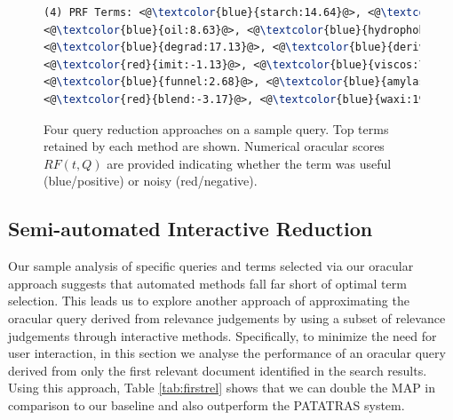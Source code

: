 \begin{figure}[htpb]
\begin{framed}
\begin{lstlisting}[basicstyle=\small\ttfamily , linewidth=\columnwidth,breaklines=true, language=TeX]
(4) PRF Terms: <@\textcolor{blue}{starch:14.64}@>, <@\textcolor{blue}{encapsul:17.50}@>, <@\textcolor{red}{chees:-4.22}@>, 
<@\textcolor{blue}{oil:8.63}@>, <@\textcolor{blue}{hydrophob:5.45}@>, <@\textcolor{blue}{agent:5.19}@>, <@\textcolor{red}{casein:-2.19}@>, 
<@\textcolor{blue}{degrad:17.13}@>, <@\textcolor{blue}{deriv:11.97}@>, <@\textcolor{blue}{tablet:5.30}@>, <@\textcolor{red}{debranch:-10.58}@>, 
<@\textcolor{red}{imit:-1.13}@>, <@\textcolor{blue}{viscos:7.77}@>, <@\textcolor{blue}{oxid:5.97}@>, <@\textcolor{blue}{activ:5.98}@>, <@\textcolor{blue}{osa:9.32}@>, 
<@\textcolor{blue}{funnel:2.68}@>, <@\textcolor{blue}{amylas:26.06}@>, <@\textcolor{red}{amylopectin:-7.14}@>, <@\textcolor{blue}{maiz:20.61}@>, 
<@\textcolor{red}{blend:-3.17}@>, <@\textcolor{blue}{waxi:19.41}@>, <@\textcolor{blue}{convert:31.81}@>, 

 \end{lstlisting} 
 \vspace*{-2ex}
\end{framed}
 \vspace*{-2ex}
  \caption{Four query reduction approaches on a sample query.  Top
    terms retained by each method are shown.  Numerical oracular
    scores $\mathit{RF}(t,Q)$ are provided indicating whether the term
    was useful (blue/positive) or noisy (red/negative).}
  \label{fig:anecdotal}  
\end{figure}
\FloatBarrier
\subsection{Semi-automated Interactive Reduction}
\label{sec:SemiAutomatedInteractiveReduction}
Our sample analysis of specific queries and terms selected via our oracular
approach suggests that automated methods fall far short of optimal term selection.
This leads us to explore another approach of approximating the oracular query
derived from relevance judgements by using a subset of relevance judgements
through interactive methods. Specifically, to minimize the need for user interaction,
in this section we analyse the performance of an oracular query derived from
only the first relevant document identified in the search results.
Using this approach, Table \ref{tab:firstrel} shows that we can double the MAP in comparison to our baseline and also outperform the PATATRAS system.

